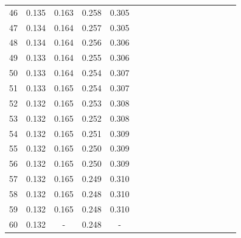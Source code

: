 \documentclass{report}
\begin{document}
\begin{appendices}
\begin{table}
\begin{tabular}{|c|cccc|cccc|cccc|cccc|}
46 & 0.135 & 0.163 & 0.258 & 0.305 & & & & & & & & & & & &\\
47 & 0.134 & 0.164 & 0.257 & 0.305 & & & & & & & & & & & &\\
48 & 0.134 & 0.164 & 0.256 & 0.306 & & & & & & & & & & & &\\
49 & 0.133 & 0.164 & 0.255 & 0.306 & & & & & & & & & & & &\\
50 & 0.133 & 0.164 & 0.254 & 0.307 & & & & & & & & & & & &\\
51 & 0.133 & 0.165 & 0.254 & 0.307 & & & & & & & & & & & &\\
52 & 0.132 & 0.165 & 0.253 & 0.308 & & & & & & & & & & & &\\
53 & 0.132 & 0.165 & 0.252 & 0.308 & & & & & & & & & & & &\\
54 & 0.132 & 0.165 & 0.251 & 0.309 & & & & & & & & & & & &\\
55 & 0.132 & 0.165 & 0.250 & 0.309 & & & & & & & & & & & &\\
56 & 0.132 & 0.165 & 0.250 & 0.309 & & & & & & & & & & & &\\
57 & 0.132 & 0.165 & 0.249 & 0.310 & & & & & & & & & & & &\\
58 & 0.132 & 0.165 & 0.248 & 0.310 & & & & & & & & & & & &\\
59 & 0.132 & 0.165 & 0.248 & 0.310 & & & & & & & & & & & &\\
60 & 0.132 &   -   & 0.248 &   -   & & & & & & & & & & & &\\
\hline
\end{tabular}
\end{table}


\end{appendices}
\end{document}

